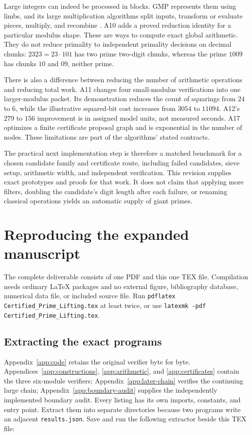 \documentclass[11pt,a4paper]{article}
\theoremstyle{definition}\newtheorem{definition}[theorem]{Definition}
\theoremstyle{remark}\newtheorem{remark}[theorem]{Remark}
\begin{document}
Large integers can indeed be processed in blocks. GMP represents them
using limbs, and its large multiplication algorithms split inputs,
transform or evaluate pieces, multiply, and recombine
\cite{revision-gmp}. A10 adds a proved reduction identity for a particular
modulus shape. These are ways to compute exact global arithmetic.
They do not reduce primality to independent primality decisions on decimal
chunks: $2323=23\cdot101$ has two prime two-digit chunks, whereas the prime
$1009$ has chunks $10$ and $09$, neither prime.

There is also a difference between reducing the number of arithmetic
operations and reducing total work. A11 changes four small-modulus
verifications into one larger-modulus packet. Its demonstration reduces
the count of squarings from $24$ to $6$, while the illustrative squared-bit
cost increases from $3054$ to $11094$. A12's $279$ to $156$ improvement
is in assigned model units, not measured seconds. A17 optimizes a finite
certificate proposal graph and is exponential in the number of nodes.
These limitations are part of the algorithms' stated contracts.

The practical next implementation step is therefore a matched benchmark
for a chosen candidate family and certificate route, including failed
candidates, sieve setup, arithmetic width, and independent verification.
This revision supplies exact prototypes and proofs for that work.
It does not claim that applying more filters, doubling the candidate's
digit length after each failure, or renaming classical operations yields
an automatic supply of giant primes.


\section{Reproducing the expanded manuscript}
\label{sec:revision-reproduce}

The complete deliverable consists of one PDF and this one TEX file.
Compilation needs ordinary LaTeX packages and no external figure,
bibliography database, numerical data file, or included source file.
Run \texttt{pdflatex Certified\_Prime\_Lifting.tex} at least twice,
or use \texttt{latexmk -pdf Certified\_Prime\_Lifting.tex}.

\subsection{Extracting the exact programs}

Appendix~\ref{app:code} retains the original verifier byte for byte.
Appendices~\ref{app:constructions}, \ref{app:arithmetic}, and
\ref{app:certificates} contain the three six-module verifiers;
Appendix~\ref{app:later-chain} verifies the continuing large chain;
Appendix~\ref{app:boundary-audit} supplies the independently implemented
boundary audit. Every listing has its own imports, constants, and entry
point. Extract them into separate directories because two programs write
an adjacent \texttt{results.json}. Save and run the following extractor
beside this TEX file:
\end{document}
